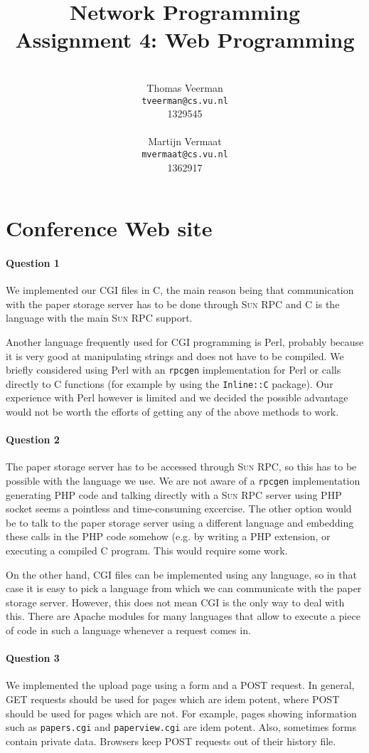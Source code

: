 \documentclass[a4paper,10pt]{article}
\title{Network Programming\\
\small{Assignment 4: Web Programming}}
\author{%
        \mbox{}\\
        Thomas Veerman\\
        \texttt{tveerman@cs.vu.nl}\\
        1329545\\
        \mbox{}\\
        Martijn Vermaat\\
        \texttt{mvermaat@cs.vu.nl}\\
        1362917
}
\begin{document}
\maketitle

\section{Conference Web site}
\paragraph{Question 1}
We implemented our \textsc{CGI} files in C, the main reason being that
communication with the paper storage server has to be done through \textsc{Sun RPC}
and C is the language with the main \textsc{Sun RPC} support.

Another language frequently used for \textsc{CGI} programming is Perl,
probably because it is very good at manipulating strings and does not have to
be compiled. We briefly considered using Perl with an \texttt{rpcgen}
implementation for Perl or calls directly to C functions (for
example by using the \texttt{Inline::C} package). Our experience with Perl
however is limited and we decided the possible advantage would not be worth the
efforts of getting any of the above methods to work.

\paragraph{Question 2}
The paper storage server has to be accessed through \textsc{Sun RPC}, so this has
to be possible with the language we use. We are not aware of a \texttt{rpcgen}
implementation generating PHP code and talking directly with a \textsc{Sun RPC}
server using PHP socket seems a pointless and time-consuming excercise. The
other option would be to talk to the paper storage server using a different language
and embedding these calls in the PHP code somehow (e.g. by writing a PHP
extension, or executing a compiled C program. This would require some work.

On the other hand, \textsc{CGI} files can be implemented using any language, so in
that case it is easy to pick a language from which we can communicate with the
paper storage server. However, this does not mean \textsc{CGI} is the only way to
deal with this. There are Apache modules for many languages that allow to
execute a piece of code in such a language whenever a request comes in.

\paragraph{Question 3}
We implemented the upload page using a form and a \textsc{POST} request. In general,
\textsc{GET} requests should be used for pages which are idem potent, where 
\textsc{POST} should be used for pages which are not. For example, pages showing
information such as \texttt{papers.cgi} and \texttt{paperview.cgi} are idem potent.
Also, sometimes forms contain private data. Browsers keep \textsc{POST} requests
out of their history file.
\end{document}
